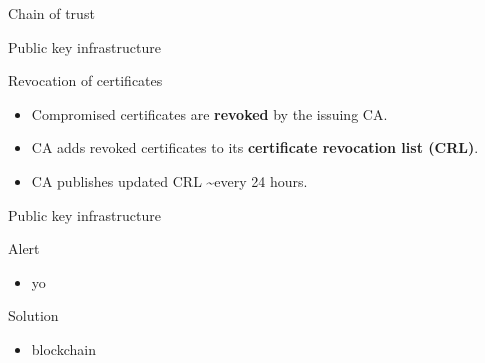 \begin{frame}{Chain of trust }
\begin{center}
\end{center}
\end{frame}



\begin{frame}{Public key infrastructure}
\begin{exampleblock}{Revocation of certificates}
\begin{itemize}
\item Compromised certificates are
\textbf{revoked} by the issuing CA.
\item CA adds revoked certificates to its
\textbf{certificate revocation list (CRL)}.
\item CA publishes updated CRL
\textasciitilde every 24 hours.
\end{itemize}
\end{exampleblock}
\end{frame}

\begin{frame}{Public key infrastructure}

\begin{alertblock}{Alert}
\begin{itemize}
\item yo
\end{itemize}
\end{alertblock}

\pause

\begin{exampleblock}{Solution}
\begin{itemize}
\item blockchain
\end{itemize}
\end{exampleblock}

\end{frame}


